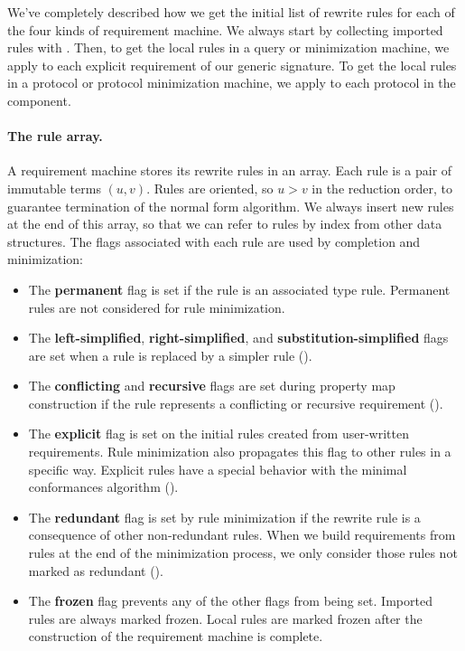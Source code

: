 \documentclass[../generics]{subfiles}
\begin{document}
We've completely described how we get the initial list of rewrite rules for each of the four kinds of requirement machine. We always start by collecting imported rules with . Then, to get the local rules in a query or minimization machine, we apply  to each explicit requirement of our generic signature. To get the local rules in a protocol or protocol minimization machine, we apply  to each protocol in the component.

\paragraph{The rule array.}
%
%
A requirement machine stores its rewrite rules in an array. Each rule is a pair of immutable terms $(u,v)$. Rules are oriented, so $u>v$ in the reduction order, to guarantee termination of the normal form algorithm. We always insert new rules at the end of this array, so that we can refer to rules by index from other data structures. The flags associated with each rule are used by completion and minimization:
\begin{itemize}
\item The \textbf{permanent} flag is set if the rule is an associated type rule. Permanent rules are not considered for rule minimization.
\item The \textbf{left-simplified}, \textbf{right-simplified}, and \textbf{substitution-simplified} flags are set when a rule is replaced by a simpler rule ().
\item The \textbf{conflicting} and \textbf{recursive} flags are set during property map construction if the rule represents a conflicting or recursive requirement ().
\item The \textbf{explicit} flag is set on the initial rules created from user-written requirements. Rule minimization also propagates this flag to other rules in a specific way. Explicit rules have a special behavior with the minimal conformances algorithm ().
\item The \textbf{redundant} flag is set by rule minimization if the rewrite rule is a consequence of other non-redundant rules. When we build requirements from rules at the end of the minimization process, we only consider those rules not marked as redundant ().
\item The \textbf{frozen} flag prevents any of the other flags from being set. Imported rules are always marked frozen. Local rules are marked frozen after the construction of the requirement machine is complete.
\end{itemize}
\end{document}
